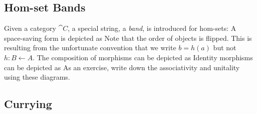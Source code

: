 \subsection{Hom-set Bands}

Given a category $\cat{C}$, a special string, a \emph{band}, is introduced for hom-sets:
A space-saving form is depicted as
Note that the order of objects is flipped. %
This is resulting from the unfortunate convention that we write $b = h(a)$ but not $h : B \leftarrow A$.
\mynewline
The composition of morphisms can be depicted as
\mynewline
Identity morphisms can be depicted as
As an exercise, write down the associativity and unitality using these diagrams. 


\subsection{Currying}


